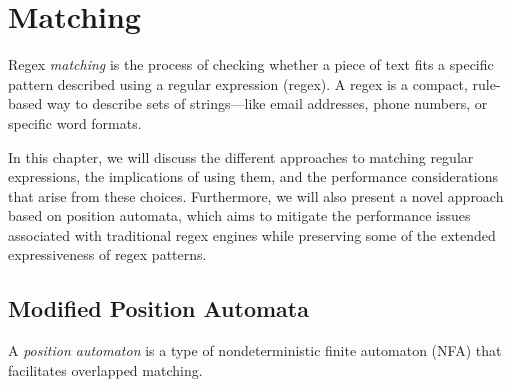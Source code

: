 \chapter{Matching}\label{chap:matching}

Regex \emph{matching} is the process of checking whether a piece of text fits a specific pattern described using a regular expression (regex). A regex is a compact, rule-based way to describe sets of strings—like email addresses, phone numbers, or specific word formats.

In this chapter, we will discuss the different approaches to matching regular expressions, the implications of using them, and the performance considerations that arise from these choices. Furthermore, we will also present a novel approach based on position automata, which aims to mitigate the performance issues associated with traditional regex engines while preserving some of the extended expressiveness of regex patterns.

\section{Modified Position Automata}
A \emph{position automaton} is a type of nondeterministic finite automaton (NFA) that facilitates overlapped matching.

